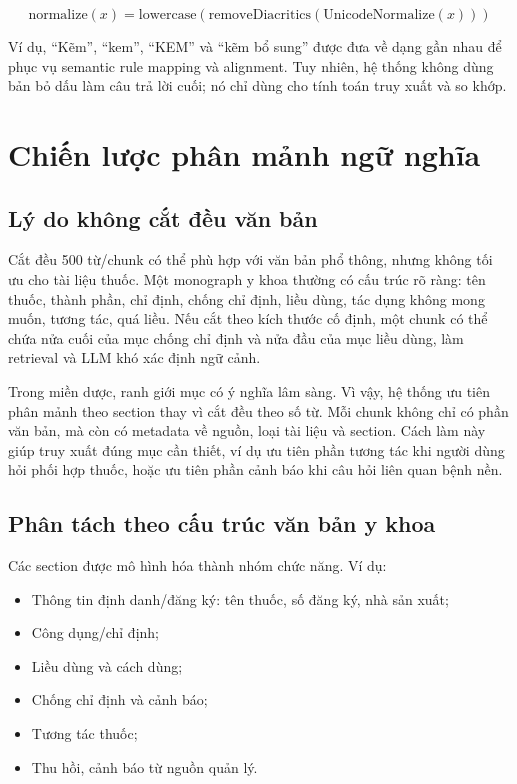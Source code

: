 \begin{formulabox}
\[
\mathrm{normalize}(x)=
\mathrm{lowercase}(
\mathrm{removeDiacritics}(
\mathrm{UnicodeNormalize}(x)))
\]
\end{formulabox}

Ví dụ, ``Kẽm'', ``kem'', ``KEM'' và ``kẽm bổ sung'' được đưa về dạng gần nhau để phục vụ semantic rule mapping và alignment. Tuy nhiên, hệ thống không dùng bản bỏ dấu làm câu trả lời cuối; nó chỉ dùng cho tính toán truy xuất và so khớp.

\section{Chiến lược phân mảnh ngữ nghĩa}

\subsection{Lý do không cắt đều văn bản}

Cắt đều 500 từ/chunk có thể phù hợp với văn bản phổ thông, nhưng không tối ưu cho tài liệu thuốc. Một monograph y khoa thường có cấu trúc rõ ràng: tên thuốc, thành phần, chỉ định, chống chỉ định, liều dùng, tác dụng không mong muốn, tương tác, quá liều. Nếu cắt theo kích thước cố định, một chunk có thể chứa nửa cuối của mục chống chỉ định và nửa đầu của mục liều dùng, làm retrieval và LLM khó xác định ngữ cảnh.

Trong miền dược, ranh giới mục có ý nghĩa lâm sàng. Vì vậy, hệ thống ưu tiên phân mảnh theo section thay vì cắt đều theo số từ. Mỗi chunk không chỉ có phần văn bản, mà còn có metadata về nguồn, loại tài liệu và section. Cách làm này giúp truy xuất đúng mục cần thiết, ví dụ ưu tiên phần tương tác khi người dùng hỏi phối hợp thuốc, hoặc ưu tiên phần cảnh báo khi câu hỏi liên quan bệnh nền.

\subsection{Phân tách theo cấu trúc văn bản y khoa}

Các section được mô hình hóa thành nhóm chức năng. Ví dụ:

\begin{itemize}
  \item Thông tin định danh/đăng ký: tên thuốc, số đăng ký, nhà sản xuất;
  \item Công dụng/chỉ định;
  \item Liều dùng và cách dùng;
  \item Chống chỉ định và cảnh báo;
  \item Tương tác thuốc;
  \item Thu hồi, cảnh báo từ nguồn quản lý.
\end{itemize}

